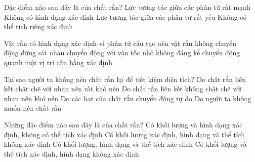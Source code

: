 %
\begin{ex}
	Đặc điểm nào sau đây là của chất rắn?
	\choice
	{\True Lực tương tác giữa các phân tử rất mạnh}
	{Không có hình dạng xác định}
	{Lực tương tác giữa các phân tử rất yếu}
	{Không có thể tích riêng xác định}
	\end{ex}

\begin{ex}
	Vật rắn có hình dạng xác định vì phân tử cấu tạo nên vật rắn
	\choice
	{không chuyển động}
	{đứng sát nhau}
	{chuyển động với vận tốc nhỏ không đáng kể}
	{\True chuyển động quanh một vị trí cân bằng xác định}
	\end{ex}

\begin{ex}
	Tại sao người ta không nén chất rắn lại để tiết kiệm diện tích?
	\choice
	{\True Do chất rắn liên kết chặt chẽ với nhau nên rất khó nén}
	{Do chất rắn liên kết không chặt chẽ với nhau nên khó nén}
	{Do các hạt của chất rắn chuyển động tự do}
	{Do người ta không muốn nén chất rắn}
	\end{ex}

\begin{ex}
	Những đặc điểm nào sau đây là của chất rắn?
	\choice
	{Có khối lượng và hình dạng xác định, không có thể tích xác định}
	{Có khối lượng xác định, hình dạng và thể tích không xác định}
	{\True Có khối lượng, hình dạng và thể tích xác định}
	{Có khối lượng và thể tích xác định, hình dạng không xác định}
	\end{ex}

